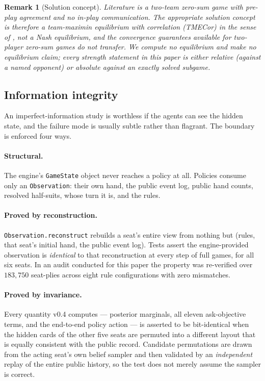 \documentclass[11pt,letterpaper]{article}
\newtheorem{remark}{Remark}
\begin{document}
\begin{remark}[Solution concept]
Literature is a two-team zero-sum game with pre-play agreement and no in-play
communication. The appropriate solution concept is therefore a team-maximin
equilibrium with correlation (TMECor) in the sense of
\citet{celli2018computational}, not a Nash equilibrium, and the convergence
guarantees available for two-player zero-sum games do not transfer. We compute
no equilibrium and make no equilibrium claim; every strength statement in this
paper is either relative (against a named opponent) or absolute against an
exactly solved subgame.
\end{remark}

\subsection{Information integrity}
\label{sec:integrity}

An imperfect-information study is worthless if the agents can see the hidden
state, and the failure mode is usually subtle rather than flagrant. The
boundary is enforced four ways.

\paragraph{Structural.} The engine's \texttt{GameState} object never reaches a
policy at all. Policies consume only an \texttt{Observation}: their own hand,
the public event log, public hand counts, resolved half-suits, whose turn it
is, and the rules.

\paragraph{Proved by reconstruction.} \texttt{Observation.reconstruct} rebuilds
a seat's entire view from nothing but (rules, that seat's initial hand, the
public event log). Tests assert the engine-provided observation is
\emph{identical} to that reconstruction at every step of full games, for all
six seats. In an audit conducted for this paper the property was re-verified
over $183{,}750$ seat-plies across eight rule configurations with zero
mismatches.

\paragraph{Proved by invariance.} Every quantity v0.4 computes --- posterior
marginals, all eleven ask-objective terms, and the end-to-end policy action ---
is asserted to be bit-identical when the hidden cards of the other five seats
are permuted into a different layout that is equally consistent with the public
record. Candidate permutations are drawn from the acting seat's own belief
sampler and then validated by an \emph{independent} replay of the entire public
history, so the test does not merely assume the sampler is correct.
\end{document}
